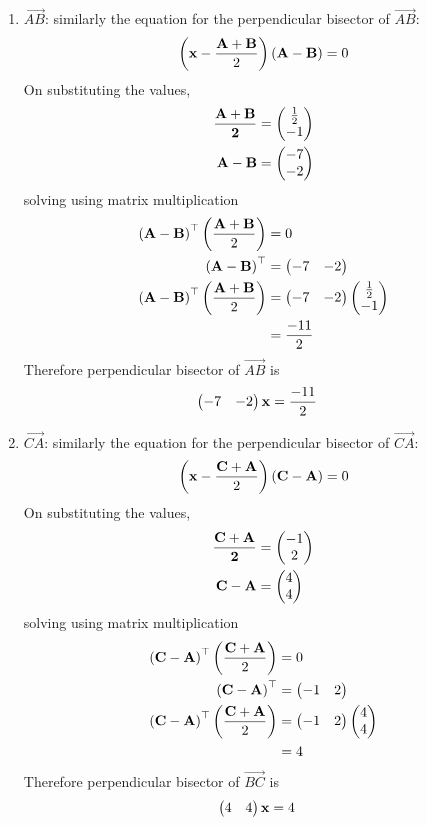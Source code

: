 \documentclass[11pt]{book}
\begin{document}
\begin{enumerate}[label=\thesection.\arabic*.,ref=\thesection.\theenumi]
\begin{enumerate}
  \item $\vec{AB}$: similarly the equation for the perpendicular bisector of $\vec{AB}$:
\begin{align}
    \left(\mathbf{x}-\frac{\mathbf{A}+\mathbf{B}}{2}\right)\left(\mathbf{A}-\mathbf{B}\right) = 0
\end{align}
On substituting the values,
\begin{align}
    \mathbf{\frac{\mathbf{A}+\mathbf{B}}{2}} &= \begin{pmatrix}\frac{1}{2} \\ -1\end{pmatrix} \\
\mathbf{A}-\mathbf{B} &= \begin{pmatrix}-7 \\ -2\end{pmatrix} \\
\end{align}
solving using matrix multiplication
\begin{align}
\left(\mathbf{A}-\mathbf{B}\right)^{\top}\left(\frac{\mathbf{A}+\mathbf{B}}{2}\right)&=0 \\
\left(\mathbf{A}-\mathbf{B}\right)^{\top} &= \begin{pmatrix}-7 & -2\end{pmatrix} \\
\left(\mathbf{A}-\mathbf{B}\right)^{\top}\left(\frac{\mathbf{A}+\mathbf{B}}{2}\right)&=\begin{pmatrix}-7 & -2\end{pmatrix}\begin{pmatrix}\frac{1}{2} \\ -1\end{pmatrix}\\
&= \frac{-11}{2}
\end{align}
Therefore perpendicular bisector of $\vec{AB}$ is
\begin{align}
    \begin{pmatrix}-7 & -2\end{pmatrix}\mathbf{x}&= \frac{-11}{2}
\end{align}

  \item $\vec{CA}$: similarly the equation for the perpendicular bisector of $\vec{CA}$:
\begin{align}
    \left(\mathbf{x}-\frac{\mathbf{C}+\mathbf{A}}{2}\right)\left(\mathbf{C}-\mathbf{A}\right) = 0
\end{align}
On substituting the values,
\begin{align}
    \mathbf{\frac{\mathbf{C}+\mathbf{A}}{2}} &= \begin{pmatrix}-1 \\ 2\end{pmatrix} \\
\mathbf{C}-\mathbf{A} &= \begin{pmatrix}4 \\ 4\end{pmatrix} \\
\end{align}
solving using matrix multiplication
\begin{align}
\left(\mathbf{C}-\mathbf{A}\right)^{\top}\left(\frac{\mathbf{C}+\mathbf{A}}{2}\right)&=0 \\
\left(\mathbf{C}-\mathbf{A}\right)^{\top} &= \begin{pmatrix}-1 & 2\end{pmatrix} \\
\left(\mathbf{C}-\mathbf{A}\right)^{\top}\left(\frac{\mathbf{C}+\mathbf{A}}{2}\right)&=\begin{pmatrix}-1 & 2\end{pmatrix}\begin{pmatrix}4 \\ 4\end{pmatrix}\\
&= 4
\end{align}
Therefore perpendicular bisector of $\vec{BC}$ is
\begin{align}
    \begin{pmatrix}4 & 4\end{pmatrix}\mathbf{x}&=4
\end{align}
\end{enumerate}


\end{enumerate}
\end{document}
